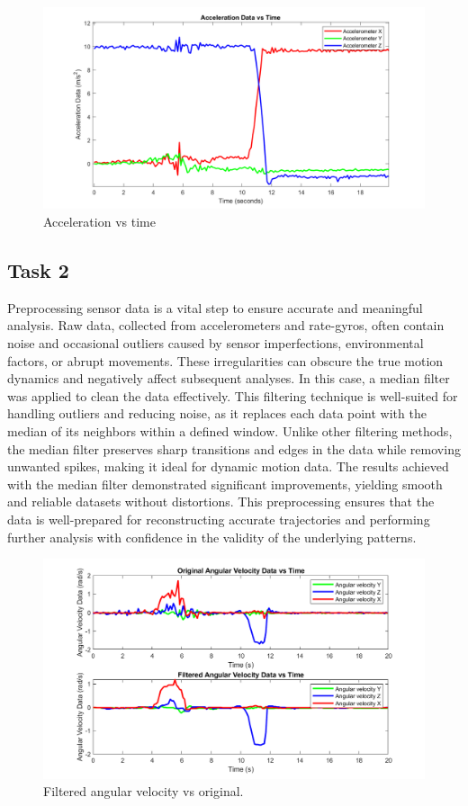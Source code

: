 \documentclass[12pt]{article}
\begin{document}
\begin{figure}[H]
    \centerline{\includegraphics[scale=0.55]{Imagens/accelerationvstime.png}}
    \caption{Acceleration vs time}
    \label{fig}
\end{figure}

\subsection{Task 2}

Preprocessing sensor data is a vital step to ensure accurate and meaningful analysis. Raw data, collected from accelerometers and rate-gyros, often contain noise and occasional outliers caused by sensor imperfections, environmental factors, or abrupt movements. These irregularities can obscure the true motion dynamics and negatively affect subsequent analyses.
In this case, a median filter was applied to clean the data effectively. This filtering technique is well-suited for handling outliers and reducing noise, as it replaces each data point with the median of its neighbors within a defined window. Unlike other filtering methods, the median filter preserves sharp transitions and edges in the data while removing unwanted spikes, making it ideal for dynamic motion data.
The results achieved with the median filter demonstrated significant improvements, yielding smooth and reliable datasets without distortions. This preprocessing ensures that the data is well-prepared for reconstructing accurate trajectories and performing further analysis with confidence in the validity of the underlying patterns.

\begin{figure}[H]
    \centerline{\includegraphics[scale=0.7]{Imagens/filteredangularvsoriginal.png}}
    \caption{Filtered angular velocity vs original.}
    \label{fig}
\end{figure}
\end{document}
